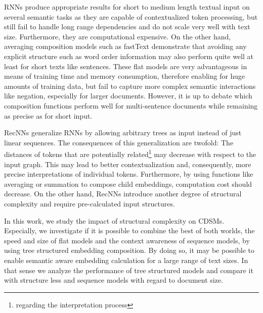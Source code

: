 \acp{RNN} produce appropriate results for short to medium length textual input on several semantic tasks  \autocite{vinyals_show_2014,wu_googles_2016,xiong_microsoft_2017} as they are capable of contextualized token processing, but still fail to handle long range dependencies and do not scale  very well with text size. Furthermore, they are computational expensive. On the other hand, averaging composition models such as fastText \autocite{joulin_bag_2017} demonstrate that avoiding any explicit structure such as word order information %
may also perform quite well at least for short texts like sentences. These flat models are very advantageous in means of training time and memory consumption, therefore enabling for huge amounts of training data, but fail to capture more complex semantic interactions like negation, especially for larger documents. However, it is up to debate which composition functions perform well for multi-sentence documents while remaining as precise as for short input.%

\acp{RecNN} \autocite{goller_learning_1996,socher_parsing_2011} generalize \acp{RNN} by allowing arbitrary trees as input instead of just linear sequences. The consequences of this generalization are twofold: The distances of tokens that are potentially related\footnote{regarding the interpretation process} may decrease with respect to the input graph. This may lead to better  contextualization and, consequently, more precise interpretations of individual tokens. Furthermore, by using functions like averaging or summation to compose child embeddings, computation cost should decrease. On the other hand, \acp{RecNN} introduce another degree of structural complexity and require pre-calculated input structures.%

In this work, we study the impact of structural complexity on \acp{CDSM}. Especially, we investigate if it is possible to combine the best of both worlds, the speed and size of flat models and the context awareness of sequence models, by using tree structured embedding composition. By doing so, it may be possible to enable semantic aware embedding calculation for a large range of text sizes. In that sense we analyze the performance of tree structured models and compare it with structure less and sequence models with regard to document size.


